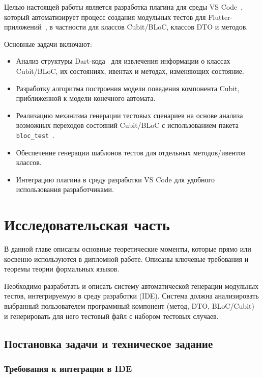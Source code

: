 \documentclass[14pt, russian]{scrartcl}
\begin{document}
Целью настоящей работы является разработка плагина для среды VS Code~\cite{VSCodeAPI}, который автоматизирует процесс создания модульных тестов для Flutter-приложений~\cite{FlutterUnitTesting}, в частности для классов Cubit/BLoC, классов DTO и методов.

Основные задачи включают:
\begin{itemize}
    \item Анализ структуры Dart-кода~\cite{DartDev} для извлечения информации о классах Cubit/BLoC, их состояниях, ивентах и методах, изменяющих состояние.
    \item Разработку алгоритма построения модели поведения компонента Cubit, приближенной к модели конечного автомата.
    \item Реализацию механизма генерации тестовых сценариев на основе анализа возможных переходов состояний Cubit/BLoC с использованием пакета \texttt{bloc\_test}~\cite{BlocTestPackage}.
    \item Обеспечение генерации шаблонов тестов для отдельных методов/ивентов классов.
    \item Интеграцию плагина в среду разработки VS Code для удобного использования разработчиками.
\end{itemize}

\section{Исследовательская часть}

В данной главе описаны основные теоретические моменты, которые прямо или косвенно используются в дипломной работе. Описаны ключевые требования и теоремы теории формальных языков.

Необходимо разработать и описать систему автоматической генерации модульных тестов, интегрируемую в среду разработки (IDE). Система должна анализировать выбранный пользователем программный компонент (метод, DTO, BLoC/Cubit) и генерировать для него тестовый файл с набором тестовых случаев.

\subsection{Постановка задачи и техническое задание}


\subsubsection{Требования к интеграции в IDE}
\end{document}
